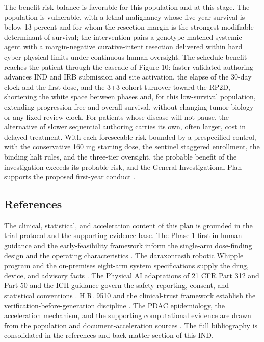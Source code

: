 The benefit-risk balance is favorable for this population and at this stage. The
population is vulnerable, with a lethal malignancy whose five-year survival is below
13 percent and for whom the resection margin is the strongest modifiable determinant
of survival; the intervention pairs a genotype-matched systemic agent with a
margin-negative curative-intent resection delivered within hard cyber-physical limits
under continuous human oversight. The schedule benefit reaches the patient through
the cascade of Figure 10: faster validated authoring advances IND and IRB submission
and site activation, the elapse of the 30-day clock and the first dose, and the 3+3
cohort turnover toward the RP2D, shortening the white space between phases and, for
this low-survival population, extending progression-free and overall survival,
without changing tumor biology or any fixed review clock. For patients whose disease
will not pause, the alternative of slower sequential authoring carries its own,
often larger, cost in delayed treatment. With each foreseeable risk bounded by a
prespecified control, with the conservative 160 mg starting dose, the sentinel
staggered enrollment, the binding halt rules, and the three-tier oversight, the
probable benefit of the investigation exceeds its probable risk, and the General
Investigational Plan supports the proposed first-year conduct \cite{pdac060s2030,daraxwhipple,clintrustpai}.

\subsection{References}

The clinical, statistical, and acceleration content of this plan is grounded in the
trial protocol and the supporting evidence base. The Phase 1 first-in-human guidance
and the early-feasibility framework inform the single-arm dose-finding design and the
operating characteristics \cite{phase1guidance}. The daraxonrasib robotic Whipple
program and the on-premises eight-arm system specifications supply the drug, device,
and advisory facts \cite{daraxwhipple,onpremwhippl,oncotrialllm}. The Physical AI
adaptations of 21 CFR Part 312 and Part 50 and the ICH guidance govern the safety
reporting, consent, and statistical conventions \cite{cfr312paiuni,cfr050paiuni,ichpaistduni}.
H.R. 9510 and the clinical-trust framework establish the verification-before-generation
discipline \cite{congress9510,clintrustpai}. The PDAC epidemiology, the acceleration
mechanism, and the supporting computational evidence are drawn from the population
and document-acceleration sources \cite{pdac060s2030,paipredict4x,natlpaiplatf,paisitedocpk,paiautospons,llmcomp16fda,fdadigtwinpc,qspmetpancre,chatgpt100kp,pdacdigtwinp}.
The full bibliography is consolidated in the references and back-matter section of
this IND.
